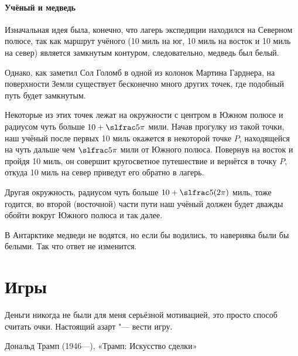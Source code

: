 \documentclass[twoside]{book}
\begin{document}
\subsubsection*{Учёный и медведь}%

Изначальная идея была, конечно, что лагерь экспедиции находился на Северном полюсе, так как маршрут учёного (10 миль на юг, 10 миль на восток и 10 миль на север) является замкнутым контуром, %
следовательно, медведь был белый.

Однако, как заметил Сол Голомб в одной из колонок 
Мартина Гарднера, %
на поверхности Земли существует бесконечно много других точек, где подобный путь будет замкнутым.

Некоторые из этих точек лежат на окружности с центром в Южном полюсе и радиусом чуть больше $10 + \slfrac5\pi$ мили.
Начав прогулку из такой точки, наш учёный после первых 10 миль окажется в некоторой точке $P$, 
находящейся на чуть дальше чем $\slfrac5\pi$ мили от Южного полюса.
Повернув на восток и пройдя 10 миль, он совершит кругосветное путешествие и вернётся в точку $P$, откуда 10 миль на север приведут его обратно в лагерь.

Другая окружность, радиусом чуть больше $10 + \slfrac5{(2\pi)}$ миль, тоже годится, во второй (восточной) части пути наш учёный должен будет дважды обойти вокруг Южного полюса и так далее.

В Антарктике медведи не водятся, но если бы водились, то наверняка были бы белыми.
Так что ответ не изменится.\heart


\chapter{Игры}

\thispagestyle{empty}

\setlength{\epigraphwidth}{.66\textwidth}
\epigraph{Деньги никогда не были для меня серьёзной мотивацией, это просто способ считать очки.
Настоящий азарт "--- вести игру.\vspace{1ex}}{Дональд Трамп (1946---),
«Трамп: Искусство сделки»}
\end{document}
